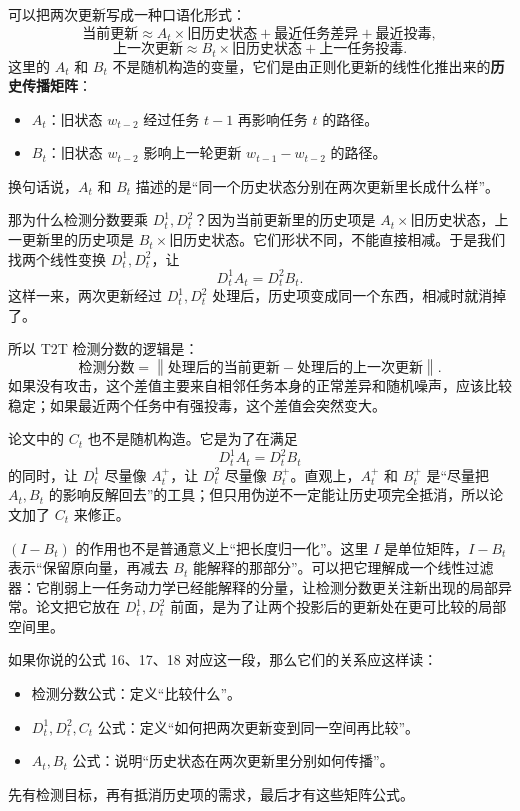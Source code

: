 \documentclass[UTF8,fontset=none,11pt]{ctexart}
\theoremstyle{cnstyle}
\newcommand{\norm}[1]{\left\lVert #1\right\rVert}
\begin{document}
可以把两次更新写成一种口语化形式：
\[
  \text{当前更新}
  \approx
  A_t\times\text{旧历史状态}
  +\text{最近任务差异}
  +\text{最近投毒},
\]
\[
  \text{上一次更新}
  \approx
  B_t\times\text{旧历史状态}
  +\text{上一任务投毒}.
\]
这里的 \(A_t\) 和 \(B_t\) 不是随机构造的变量，它们是由正则化更新的线性化推出来的\textbf{历史传播矩阵}：
\begin{itemize}
  \item \(A_t\)：旧状态 \(w_{t-2}\) 经过任务 \(t-1\) 再影响任务 \(t\) 的路径。
  \item \(B_t\)：旧状态 \(w_{t-2}\) 影响上一轮更新 \(w_{t-1}-w_{t-2}\) 的路径。
\end{itemize}
换句话说，\(A_t\) 和 \(B_t\) 描述的是“同一个历史状态分别在两次更新里长成什么样”。

那为什么检测分数要乘 \(D_t^1,D_t^2\)？因为当前更新里的历史项是 \(A_t\times\text{旧历史状态}\)，上一更新里的历史项是 \(B_t\times\text{旧历史状态}\)。它们形状不同，不能直接相减。于是我们找两个线性变换 \(D_t^1,D_t^2\)，让
\[
  D_t^1A_t=D_t^2B_t.
\]
这样一来，两次更新经过 \(D_t^1,D_t^2\) 处理后，历史项变成同一个东西，相减时就消掉了。

所以 T2T 检测分数的逻辑是：
\[
  \text{检测分数}
  =
  \norm{
  \text{处理后的当前更新}
  -
  \text{处理后的上一次更新}
  }.
\]
如果没有攻击，这个差值主要来自相邻任务本身的正常差异和随机噪声，应该比较稳定；如果最近两个任务中有强投毒，这个差值会突然变大。

论文中的 \(C_t\) 也不是随机构造。它是为了在满足
\[
  D_t^1A_t=D_t^2B_t
\]
的同时，让 \(D_t^1\) 尽量像 \(A_t^+\)，让 \(D_t^2\) 尽量像 \(B_t^+\)。直观上，\(A_t^+\) 和 \(B_t^+\) 是“尽量把 \(A_t,B_t\) 的影响反解回去”的工具；但只用伪逆不一定能让历史项完全抵消，所以论文加了 \(C_t\) 来修正。

\((I-B_t)\) 的作用也不是普通意义上“把长度归一化”。这里 \(I\) 是单位矩阵，\(I-B_t\) 表示“保留原向量，再减去 \(B_t\) 能解释的那部分”。可以把它理解成一个线性过滤器：它削弱上一任务动力学已经能解释的分量，让检测分数更关注新出现的局部异常。论文把它放在 \(D_t^1,D_t^2\) 前面，是为了让两个投影后的更新处在更可比较的局部空间里。

如果你说的公式 16、17、18 对应这一段，那么它们的关系应这样读：
\begin{itemize}
  \item 检测分数公式：定义“比较什么”。
  \item \(D_t^1,D_t^2,C_t\) 公式：定义“如何把两次更新变到同一空间再比较”。
  \item \(A_t,B_t\) 公式：说明“历史状态在两次更新里分别如何传播”。
\end{itemize}
先有检测目标，再有抵消历史项的需求，最后才有这些矩阵公式。
\end{document}
